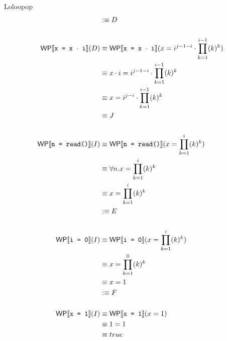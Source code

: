 \documentclass[
  english
]{tumteaching}
\begin{document}
\begin{assignment}[H,points=8]{Loloopop}
\begin{align*}
		&:\equiv D \\
		\\
		\textsf{WP}\llbracket{}\texttt{x = x $\cdot$ i}\rrbracket{}(D)
		&\equiv \textsf{WP}\llbracket{}\texttt{x = x $\cdot$ i}\rrbracket{}(x = i^{j - 1 - i} \cdot \prod \limits_{k=1}^{i-1}(k)^k) \\
		&\equiv x \cdot i = i^{j - 1 - i} \cdot \prod \limits_{k=1}^{i-1}(k)^k \\
		&\equiv x = i^{j - i} \cdot \prod \limits_{k=1}^{i-1}(k)^k \\
		&\equiv J \\
		\\
		\textsf{WP}\llbracket{}\texttt{n = read()}\rrbracket{}(I)
		&\equiv \textsf{WP}\llbracket{}\texttt{n = read()}\rrbracket{}(x = \prod \limits_{k=1}^{i}(k)^k) \\
		&\equiv \forall n.x = \prod \limits_{k=1}^{i}(k)^k \\
		&\equiv x = \prod \limits_{k=1}^{i}(k)^k \\
		&:\equiv E \\
		\\		
		\textsf{WP}\llbracket{}\texttt{i = 0}\rrbracket{}(I)
		&\equiv \textsf{WP}\llbracket{}\texttt{i = 0}\rrbracket{}(x = \prod \limits_{k=1}^{i}(k)^k) \\
		&\equiv x = \prod \limits_{k=1}^{0}(k)^k \\
		&\equiv x = 1 \\
		&:\equiv F \\
		\\		
		\textsf{WP}\llbracket{}\texttt{x = 1}\rrbracket{}(I)
		&\equiv \textsf{WP}\llbracket{}\texttt{x = 1}\rrbracket{}(x = 1) \\
		&\equiv 1 = 1 \\
		&\equiv true
	\end{align*}
\end{assignment}
\clearpage
\end{document}
